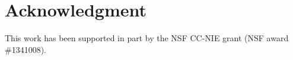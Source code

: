 \documentclass[journal]{IEEEtran}
\begin{document}



\section*{Acknowledgment}
This work has been supported in part by the NSF CC-NIE grant (NSF award \#1341008).

\ifCLASSOPTIONcaptionsoff
  \newpage
\fi






%

%


\end{document}
